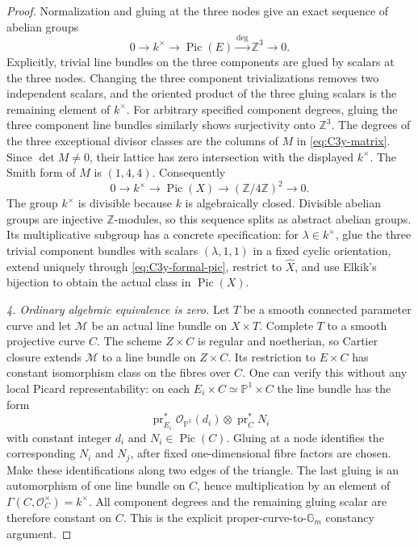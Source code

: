 \begin{proof}
Normalization and gluing at the three nodes give an exact
sequence of abelian groups
\begin{equation}\label{eq:C3y-triangle-pic}
 0\longrightarrow k^\times\longrightarrow
 \operatorname{Pic}(E)\xrightarrow{\deg}
 \mathbb Z^3\longrightarrow0.
\end{equation}
Explicitly, trivial line bundles on the three components
are glued by scalars at the three nodes. Changing the
three component trivializations removes two independent
scalars, and the oriented product of the three gluing
scalars is the remaining element of $k^\times$.
For arbitrary specified component degrees, gluing the
three component line bundles similarly shows surjectivity
onto $\mathbb Z^3$. The degrees of the three exceptional
divisor classes are the columns of $M$ in
\eqref{eq:C3y-matrix}. Since $\det M\ne0$, their lattice
has zero intersection with the displayed $k^\times$.
The Smith form of $M$ is $(1,4,4)$. Consequently
\begin{equation}\label{eq:C3y-puncture-extension}
 0\longrightarrow k^\times\longrightarrow
 \operatorname{Pic}(X)\longrightarrow
 (\mathbb Z/4\mathbb Z)^2\longrightarrow0.
\end{equation}
The group $k^\times$ is divisible because $k$ is
algebraically closed. Divisible abelian groups are
injective $\mathbb Z$-modules, so this sequence splits
as abstract abelian groups. Its multiplicative subgroup
has a concrete specification: for $\lambda\in k^\times$,
glue the three trivial component bundles with scalars
$(\lambda,1,1)$ in a fixed cyclic orientation, extend
uniquely through \eqref{eq:C3y-formal-pic}, restrict to
$\widehat X$, and use Elkik's bijection to obtain the
actual class in $\operatorname{Pic}(X)$.

\emph{4. Ordinary algebraic equivalence is zero.}
Let $T$ be a smooth connected parameter curve and let
$\mathcal M$ be an actual line bundle on $X\times T$.
Complete $T$ to a smooth projective curve $C$.
The scheme $Z\times C$ is regular and noetherian, so
Cartier closure extends $\mathcal M$ to a line bundle
on $Z\times C$. Its restriction to $E\times C$ has
constant isomorphism class on the fibres over $C$.
One can verify this without any local Picard representability:
on each $E_i\times C\simeq\mathbb P^1\times C$ the
line bundle has the form
\[
 \operatorname{pr}_{E_i}^*\mathcal O_{\mathbb P^1}(d_i)
       \otimes\operatorname{pr}_C^*N_i
\]
with constant integer $d_i$ and $N_i\in\operatorname{Pic}(C)$.
Gluing at a node identifies the corresponding $N_i$ and
$N_j$, after fixed one-dimensional fibre factors are
chosen. Make these identifications along two edges of
the triangle. The last gluing is an automorphism of
one line bundle on $C$, hence multiplication by an
element of $\Gamma(C,\mathcal O_C^\times)=k^\times$.
All component degrees and the remaining gluing scalar
are therefore constant on $C$. This is the explicit
proper-curve-to-$\mathbb G_m$ constancy argument.


\end{proof}
